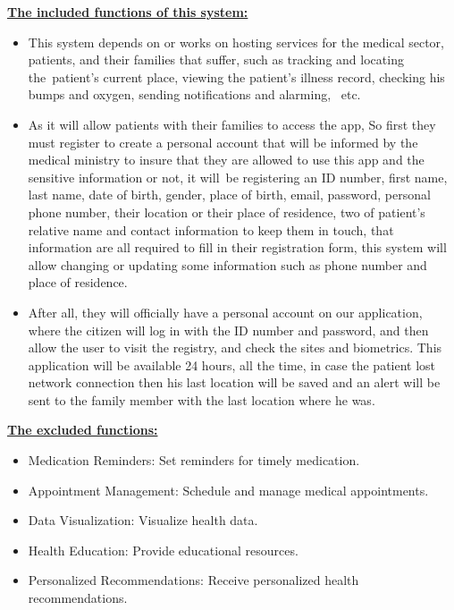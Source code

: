 \documentclass[12pt]{article}
\begin{document}
			
			\textbf{\underline{The included functions of this system: }}\\
			\begin{itemize}
				\item This system depends on or works on hosting services for the medical sector, patients, and their families that suffer, such as tracking and locating the patient's current place, viewing the patient’s illness record, checking his bumps and oxygen, sending notifications and alarming,  etc. 
				\item As it will allow patients with their families to access the app, So first they must register to create a personal account that will be informed by the medical ministry to insure that they are allowed to use this app and the sensitive information or not, it will be registering an ID number, first name, last name, date of birth, gender, place of birth, email, password, personal phone number, their location or their place of residence, two of patient’s relative name and contact information to keep them in touch, that information are all required to fill in their registration form, this system will allow changing or updating some information such as phone number and place of residence. 
				\item After all, they will officially have a personal account on our application, where the citizen will log in with the ID number and password, and then allow the user to visit the registry, and check the sites and biometrics. 
				This application will be available 24 hours, all the time, in case the patient lost network connection then his last location will be saved and an alert will be sent to the family member  with the last location where he was.
			\end{itemize}
		
			\begin{center}
			\end{center}
			\textbf{\underline{The excluded functions:}} \\
			\begin{itemize}
				\item Medication Reminders: Set reminders for timely medication.
				\item Appointment Management: Schedule and manage medical appointments.
				\item Data Visualization: Visualize health data.
				\item Health Education: Provide educational resources.
				\item Personalized Recommendations: Receive personalized health recommendations.
				
			\end{itemize}
			 
\end{document}

